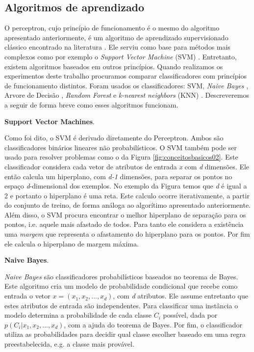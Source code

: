 \subsection{Algoritmos de aprendizado}

O perceptron, cujo princípio de funcionamento é o mesmo do algoritmo apresentado anteriormente, é um algoritmo de aprendizado supervisionado clássico encontrado na literatura \cite{Rosenblatt}.
Ele serviu como base para métodos mais complexos como por exemplo o \textit{Support Vector Machine} (SVM) \cite{Chang}.
Entretanto, existem algoritmos baseados em outros princípios.
Quando realizamos os experimentos deste trabalho procuramos comparar classificadores com princípios de funcionamento distintos.
Foram usados os classificadores: SVM, \textit{Naive Bayes} \cite{Murphy}, Arvore de Decisão \cite{Quinlan}, \textit{Random Forest} \cite{Breiman} e \textit{k-nearest neighbors} (KNN) \cite{Duda}.
Descreveremos a seguir de forma breve como esses algoritmos funcionam.

\textbf{Support Vector Machines}.

Como foi dito, o SVM é derivado diretamente do Perceptron.
Ambos são classificadores binários lineares não probabilísticos.
O SVM também pode ser usado para resolver problemas como o da Figura \ref{fig:conceitosbasicos02}.
Este classificador considera cada vetor de atributos de entrada \textit{x} com \textit{d} dimensões.
Ele então calcula um hiperplano, com \textit{d-1} dimensões, para separar os pontos no espaço \textit{d}-dimensional dos exemplos.
No exemplo da Figura temos que \textit{d} é igual a 2 e portanto o hiperplano é uma reta.
Este calculo ocorre iterativamente, a partir do conjunto de treino, de forma análoga ao algorítimo apresentado anteriormente.
Além disso, o SVM procura encontrar o melhor hiperplano de separação para os pontos, i.e. aquele mais afastado de todos. 
Para tanto ele considera a existência uma \textit{margem} que representa o afastamento do hiperplano para os pontos.
Por fim ele calcula o hiperplano de margem máxima.

\textbf{Naive Bayes}.

\textit{Naive Bayes} são classificadores probabilísticos baseados no teorema de Bayes.
Este algoritmo cria um modelo de probabilidade condicional que recebe como entrada o vetor $ \textit{x} = (x_1, x_2, ... , x_d) $, com \textit{d} atributos.
Ele assume entretanto que estes atributos de entrada são independentes.
Para classificar uma instância o modelo determina a probabilidade de cada classe $C_i$ possível, dada por $p(C_i|x_1, x_2, ... , x_d)$, com a ajuda do teorema de Bayes.
Por fim, o classificador utiliza as probabilidades para decidir qual classe escolher baseado em uma regra preestabelecida, e.g. a classe mais provável.

